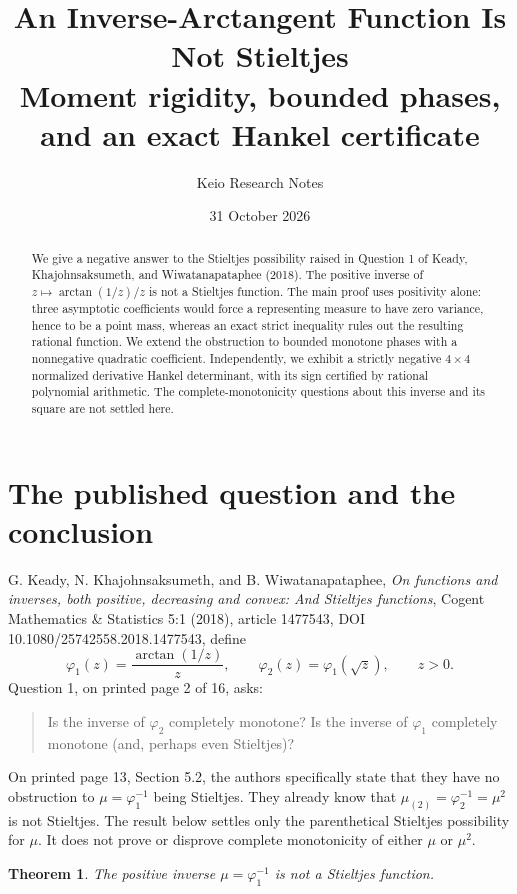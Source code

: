 \documentclass[11pt,a4paper]{article}
\title{An Inverse-Arctangent Function Is Not Stieltjes\\[4pt]
\large Moment rigidity, bounded phases, and an exact Hankel certificate}
\author{Keio Research Notes}
\date{31 October 2026}
\newtheorem{theorem}{Theorem}
\begin{document}
\maketitle
\begin{abstract}
We give a negative answer to the Stieltjes possibility raised in Question 1
of Keady, Khajohnsaksumeth, and Wiwatanapataphee (2018). The positive inverse
of $z\mapsto\arctan(1/z)/z$ is not a Stieltjes function. The main proof
uses positivity alone: three asymptotic coefficients would force a
representing measure to have zero variance, hence to be a point mass,
whereas an exact strict inequality rules out the resulting rational function.
We extend the obstruction to bounded monotone phases with a nonnegative
quadratic coefficient. Independently, we exhibit a strictly negative
$4\times4$ normalized derivative Hankel determinant, with its sign certified
by rational polynomial arithmetic. The complete-monotonicity questions
about this inverse and its square are not settled here.
\end{abstract}
\section{The published question and the conclusion}
G. Keady, N. Khajohnsaksumeth, and B. Wiwatanapataphee,
\emph{On functions and inverses, both positive, decreasing and convex:
And Stieltjes functions}, Cogent Mathematics \& Statistics 5:1 (2018),
article 1477543, DOI 10.1080/25742558.2018.1477543, define
\[
 \varphi_1(z)=\frac{\arctan(1/z)}{z},\qquad
 \varphi_2(z)=\varphi_1(\sqrt z),\qquad z>0.
\]
Question 1, on printed page 2 of 16, asks:
\begin{quote}
Is the inverse of $\varphi_2$ completely monotone?
Is the inverse of $\varphi_1$ completely monotone
(and, perhaps even Stieltjes)?
\end{quote}
On printed page 13, Section 5.2, the authors specifically state that
they have no obstruction to $\mu=\varphi_1^{-1}$ being Stieltjes.
They already know that $\mu_{(2)}=\varphi_2^{-1}=\mu^2$ is not
Stieltjes. The result below settles only the parenthetical Stieltjes
possibility for $\mu$. It does not prove or disprove complete
monotonicity of either $\mu$ or $\mu^2$.

\begin{theorem}
The positive inverse $\mu=\varphi_1^{-1}$ is not a Stieltjes function.
\end{theorem}
\end{document}
